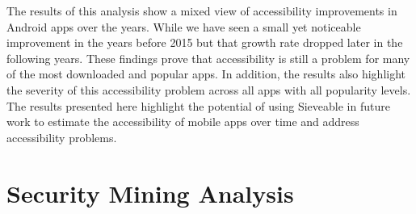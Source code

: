 The results of this analysis show a mixed view of accessibility improvements in Android apps over the years.
While we have seen a small yet noticeable improvement in the years before 2015 but that growth rate dropped later in the following years.
These findings prove that accessibility is still a problem for many of the most downloaded and popular apps.
In addition, the results also highlight the severity of this accessibility problem across all apps with all popularity levels.
The results presented here highlight the potential of using Sieveable in future work to estimate the accessibility of mobile apps over time and address accessibility problems.

\section{Security Mining Analysis}
